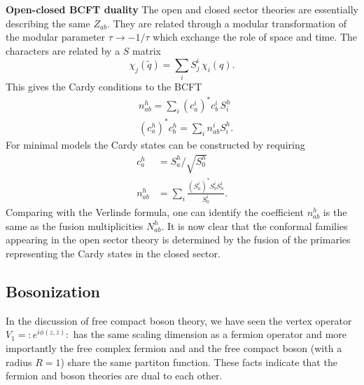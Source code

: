 \documentclass[submission, PhysLectNotes]{SciPost}
\begin{document}
{\bf Open-closed BCFT duality}
The open and closed sector theories are essentially describing the same $Z_{ab}$. They are related through a modular transformation of the modular parameter $\tau \rightarrow -1/\tau$ which exchange the role of space and time. The characters are related by a $S$ matrix 
\begin{equation}
    \chi_j(\tilde{q}) = \sum_i S^i_j\, \chi_i(q).
\end{equation}
This gives the Cardy conditions to the BCFT
\begin{equation}
\begin{split}
    & n_{ab}^h = \sum_i \left(c_a^i\right)^* c_b^i\, S_i^h \\
    & \left(c_a^h\right)^* c_b^h = \sum_i n_{ab}^i S^h_i.  
\end{split}
\end{equation}
For minimal models the Cardy states can be constructed by requiring
\begin{equation}
\begin{split}
    c_a^h &= S_a^h / \sqrt{S^h_0} \\
    n_{ab}^h &= \sum_i \frac{\left(S_a^i\right)^* S_b^i S_h^i}{S_0^i}.
\end{split}
\end{equation}
Comparing with the Verlinde formula, one can identify the coefficient $n_{ab}^h$ is the same as the fusion multiplicities $N_{ab}^h$. It is now clear that the conformal families appearing in the open sector theory is determined by the fusion of the primaries representing the Cardy states in the closed sector. 

\subsection{Bosonization}
In the discussion of free compact boson theory, we have seen the vertex operator $V_1 = :e^{i\phi(z,\bar{z})}:$ has the same scaling dimension as a fermion operator and more importantly the free complex fermion and and the free compact boson (with a radius $R=1$) share the same partiton function. These facts indicate that the fermion and boson theories are dual to each other. 
\end{document}
